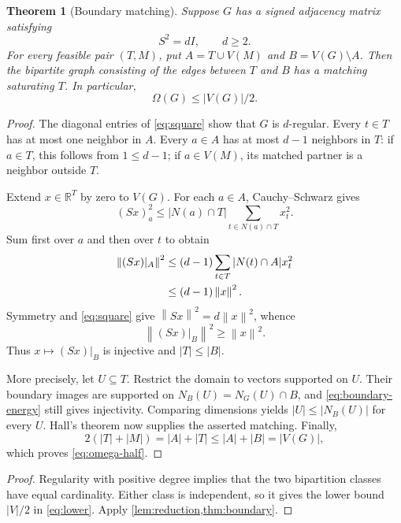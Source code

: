 \documentclass[11pt]{article}
\newtheorem{theorem}{Theorem}[section]
\newtheorem{corollary}[theorem]{Corollary}
\theoremstyle{definition}
\theoremstyle{remark}
\newcommand{\psq}{\psi_{\mathrm{sq}}}
\newcommand{\bii}{\beta_2}
\newcommand{\R}{\mathbb R}
\newcommand{\Om}{\Omega}
\newcommand{\norm}[1]{\left\lVert#1\right\rVert}
\begin{document}
\begin{theorem}[Boundary matching]\label{thm:boundary}
Suppose $G$ has a signed adjacency matrix satisfying
\begin{equation}\label{eq:square}
 S^2=dI,\qquad d\ge2.
\end{equation}
For every feasible pair $(T,M)$, put $A=T\cup V(M)$ and $B=V(G)\setminus A$.
Then the bipartite graph consisting of the edges between $T$ and $B$ has
a matching saturating $T$. In particular,
\begin{equation}\label{eq:omega-half}
 \Om(G)\le |V(G)|/2.
\end{equation}
\end{theorem}
\begin{proof}
The diagonal entries of \eqref{eq:square} show that $G$ is $d$-regular.
Every $t\in T$ has at most one neighbor in $A$. Every $a\in A$ has at most
$d-1$ neighbors in $T$: if $a\in T$, this follows from $1\le d-1$; if
$a\in V(M)$, its matched partner is a neighbor outside $T$.

Extend $x\in\R^T$ by zero to $V(G)$. For each $a\in A$, Cauchy--Schwarz
gives
\[
 (Sx)_a^2\le |N(a)\cap T|\sum_{t\in N(a)\cap T}x_t^2.
\]
Sum first over $a$ and then over $t$ to obtain
\begin{align}
 \norm{(Sx)|_A}^2
 &\le(d-1)\sum_{t\in T}|N(t)\cap A|x_t^2\notag\\
 &\le(d-1)\norm{x}^2.\label{eq:restricted}
\end{align}
Symmetry and \eqref{eq:square} give $\norm{Sx}^2=d\norm{x}^2$, whence
\begin{equation}\label{eq:boundary-energy}
 \norm{(Sx)|_B}^2\ge\norm{x}^2.
\end{equation}
Thus $x\mapsto(Sx)|_B$ is injective and $|T|\le|B|$.

More precisely, let $U\subseteq T$. Restrict the domain to vectors
supported on $U$. Their boundary images are supported on
$N_B(U)=N_G(U)\cap B$, and \eqref{eq:boundary-energy} still gives
injectivity. Comparing dimensions yields $|U|\le|N_B(U)|$ for every $U$.
Hall's theorem now supplies the asserted matching. Finally,
\[
 2(|T|+|M|)=|A|+|T|\le |A|+|B|=|V(G)|,
\]
which proves \eqref{eq:omega-half}.
\end{proof}

\begin{proof}
Regularity with positive degree implies that the two bipartition classes
have equal cardinality. Either class is independent, so it gives the
lower bound $|V|/2$ in \eqref{eq:lower}. Apply \cref{lem:reduction,thm:boundary}.
\end{proof}
\end{document}
